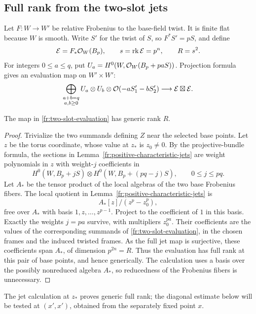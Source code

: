 \subsection{Full rank from the two-slot jets}
\label{fr:full-rank}

Let $F:W\to W'$ be relative Frobenius to the base-field twist.
It is finite flat because $W$ is smooth.  Write $S'$ for the twist
of $S$, so $F^*S'=pS$, and define
\[
 \mathcal E=F_*\mathcal O_W(B_p),\qquad s=\operatorname{rk}\mathcal E=p^n,
 \qquad R=s^2.
\]
For integers $0\le a\le q$, put
$U_a=H^0(W,\mathcal O_W(B_p+paS))$.
Projection formula gives an evaluation map on $W'\times W'$:
\begin{equation}\label{fr:two-slot-evaluation}
 \bigoplus_{\substack{a+b=q\\a,b\ge0}}
 U_a\otimes U_b\otimes
 \mathcal O(-aS'_1-bS'_2)
 \longrightarrow \mathcal E\boxtimes\mathcal E.
\end{equation}

\begin{lemma}\label{fr:generic-rank}
The map in \eqref{fr:two-slot-evaluation} has generic rank $R$.
\end{lemma}

\begin{proof}
Trivialize the two summands defining $Z$ near the selected base
points.  Let $z$ be the torus coordinate, whose value at $z_*$ is
$z_0\ne0$.  By the projective-bundle formula, the sections in
Lemma~\ref{fr:positive-characteristic-jets} are weight polynomials in $z$
with weight-$j$ coefficients in
\[
 H^0(W,B_p+jS)\otimes
 H^0(W,B_p+(pq-j)S),\qquad 0\le j\le pq.
\]
Let $A_*$ be the tensor product of the local algebras of the two
base Frobenius fibers.  The local quotient in
Lemma~\ref{fr:positive-characteristic-jets} is
\[
 A_*[z]/(z^p-z_0^p),
\]
free over $A_*$ with basis $1,z,\ldots,z^{p-1}$.  Project to the
coefficient of $1$ in this basis.  Exactly the weights $j=pa$
survive, with multipliers $z_0^{pa}$.  Their coefficients are the
values of the corresponding summands of
\eqref{fr:two-slot-evaluation}, in the chosen frames and the induced
twisted frames.  As the full jet map is surjective, these coefficients
span $A_*$, of dimension $p^{2n}=R$.  Thus the evaluation has full
rank at this pair of base points, and hence generically.  The
calculation uses a basis over the possibly nonreduced algebra $A_*$,
so reducedness of the Frobenius fibers is unnecessary.
\end{proof}

The jet calculation at $z_*$ proves generic full rank; the diagonal
estimate below will be tested at $(x',x')$, obtained from the
separately fixed point $x$.


